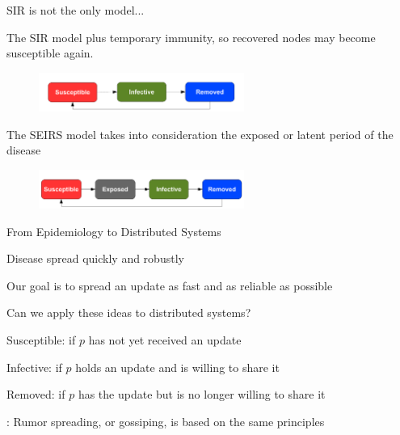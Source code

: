 \begin{frame}{SIR is not the only model...}
		\begin{definition}
			The SIR model plus temporary immunity, so recovered nodes may
			become susceptible again.	
		\end{definition}
		\begin{figure}
			\includegraphics[width=0.6\textwidth]{figs/05/model-sirs}
		\end{figure}
		\begin{definition}
			The SEIRS model takes into consideration the \alert{exposed} or 
			latent period of the disease
		\end{definition}
		\begin{figure}
			\includegraphics[width=0.6\textwidth]{figs/05/model-seirs}
		\end{figure}
\end{frame}

\begin{frame}{From Epidemiology to Distributed Systems}


\BI
\item Disease spread quickly and robustly
\item Our goal is to spread an update as fast and as reliable as possible
\item Can we apply these ideas to distributed systems?
\EI

\bigskip
\begin{definition}
\BI
\item \alert{Susceptible}:	if $p$ has not yet received an update
\item \alert{Infective}:		if $p$ holds an update and is willing to share it
\item \alert{Removed}:	if $p$ has the update but is no longer willing to share it
\EI

\end{definition}

\bigskip
{}: Rumor spreading, or gossiping, is based on the same principles


\end{frame}



